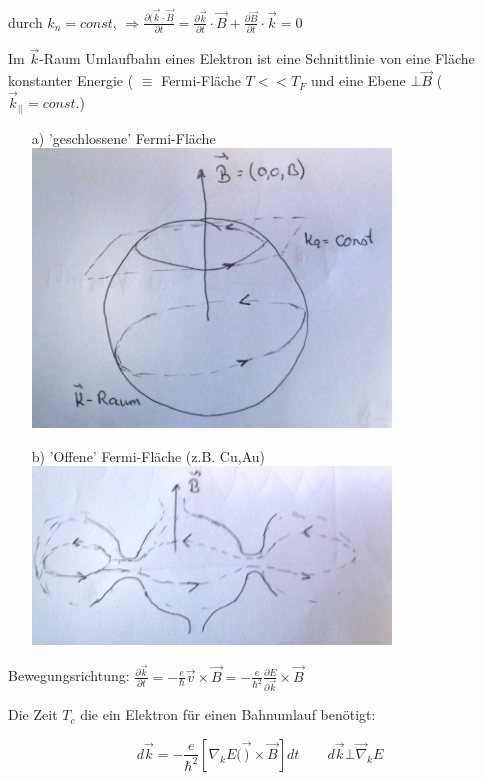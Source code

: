 durch \(k_n=const\), \(\Rightarrow \frac{\partial(\vec k\cdot\vec B}{\partial t} = \frac{\partial \vec k}{\partial t}\cdot \vec B + \frac{\partial \vec B}{\partial t}\cdot\vec k = 0\)

Im \(\vec k\)-Raum Umlaufbahn eines Elektron ist eine Schnittlinie von eine Fläche konstanter Energie ( \(\equiv\) Fermi-Fläche \(T<<T_F\) und eine Ebene \(\bot \vec B\) (\(\vec k_{||} = const.\))

\begin{enumerate}
\item[a)] 'geschlossene' Fermi-Fläche
\includegraphics[width=0.75\textwidth]{kap10_05.png}

\item[b)] 'Offene' Fermi-Fläche (z.B. Cu,Au)
\includegraphics[width=0.75\textwidth]{kap10_06.png}
\end{enumerate}


Bewegungsrichtung: \(\frac{\partial \vec k}{\partial t} = -\frac{e}{\hbar}\vec v \times \vec B = -\frac{e}{\hbar^2}\frac{\partial E}{\partial \vec k}\times \vec B\)

Die Zeit \(T_c\) die ein Elektron für einen Bahnumlauf benötigt: 

\[d\vec k = -\frac{e}{\hbar^2}\left[\nabla_k E(\vec )\times\vec B\right]dt \qquad d\vec k\bot \vec \nabla_k E\]


